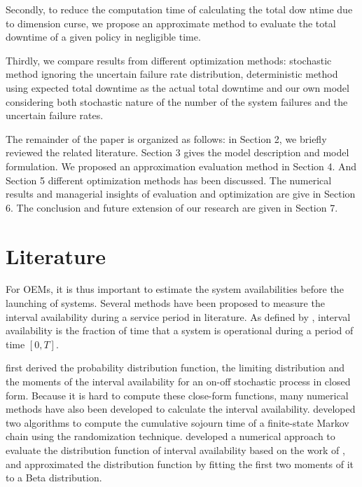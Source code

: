 \documentclass[preprint,12pt]{elsarticle}
\begin{document}
Secondly, to reduce the computation time of calculating the total dow ntime due to dimension curse, we propose an approximate method to evaluate the total downtime of a given policy in negligible time.

Thirdly, we compare results from different optimization methods: stochastic method ignoring the uncertain failure rate distribution, deterministic method using expected total downtime as the actual total downtime and our own model considering both stochastic nature of the number of the system failures and the uncertain failure rates.


The remainder of the paper is organized as follows: in Section 2, we briefly reviewed the related literature. Section 3 gives the model description and model formulation. We proposed an approximation evaluation method in Section 4. And Section 5 different optimization methods has been discussed. The numerical results and managerial insights of evaluation and optimization are give in Section 6. The conclusion and future extension of our research are given in Section 7.

\section{Literature}

For OEMs,  it is thus important to estimate the system availabilities before the launching of systems. Several methods have been proposed to measure the interval availability during a service period in literature. As defined by \citet{Nakagawa}, interval availability is the fraction of time that a system is operational during a period of time $[0,T]$.

\citet{Takacs} first derived the probability distribution function, the limiting distribution and the moments of the interval availability for an on-off stochastic process in closed form. Because  it is hard to compute these close-form functions, many numerical methods have  also been developed to calculate the interval availability. \citet{DeSouza} developed two algorithms to compute the cumulative sojourn time of a finite-state Markov chain using the randomization technique. \citet{AlHanbali} developed a numerical approach to evaluate the distribution function of interval availability based on the work of \citet{DeSouza}, and approximated the distribution function by fitting the first two moments of it to a Beta distribution.

%
\end{document}
